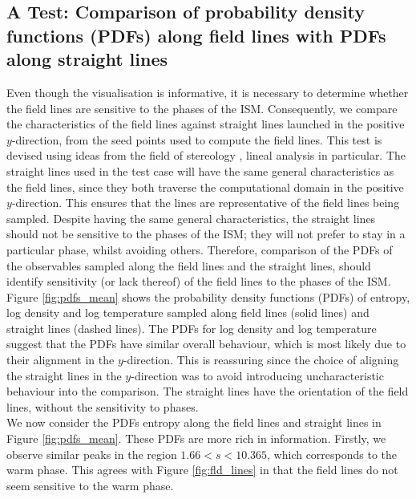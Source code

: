 \documentclass[useAMS,usenatbib]{mn2e}
\begin{document}
\subsection{A Test: Comparison of probability density functions (PDFs) along field lines with PDFs along straight lines}
Even though the visualisation is informative, it is necessary to determine whether the field lines are sensitive to the phases of the ISM. Consequently, we compare the characteristics of the field lines against straight lines launched in the positive $y$-direction, from the seed points used to compute the field lines. This test is devised using ideas from the field of stereology \citep{BJ04}, lineal analysis in particular. The straight lines used in the test case will have the same general characteristics as the field lines, since they both traverse the computational domain in the positive $y$-direction. This ensures that the lines are representative of the field lines being sampled. Despite having the same general characteristics, the straight lines should not be sensitive to the phases of the ISM; they will not prefer to stay in a particular phase, whilst avoiding others. Therefore, comparison of the PDFs of the observables sampled along the field lines and the straight lines, should identify sensitivity (or lack thereof) of the field lines to the phases of the ISM.\\
\noindent Figure \vref{fig:pdfs_mean} shows the probability density functions (PDFs) of entropy, log density and log temperature sampled along field lines (solid lines) and straight lines (dashed lines). The PDFs for log density and log temperature suggest that the PDFs have similar overall behaviour, which is most likely due to their alignment in the $y$-direction. This is reassuring since the choice of aligning the straight lines in the $y$-direction was to avoid introducing uncharacteristic behaviour into the comparison. The straight lines have the orientation of the field lines, without the sensitivity to phases.\\
We now consider the PDFs entropy along the field lines and straight lines in Figure \ref{fig:pdfs_mean}. These PDFs are more rich in information. Firstly, we observe similar peaks in the region $1.66<s<10.365$, which corresponds to the warm phase. This agrees with Figure \vref{fig:fld_lines} in that the field lines do not seem sensitive to the warm phase. \\
\end{document}
